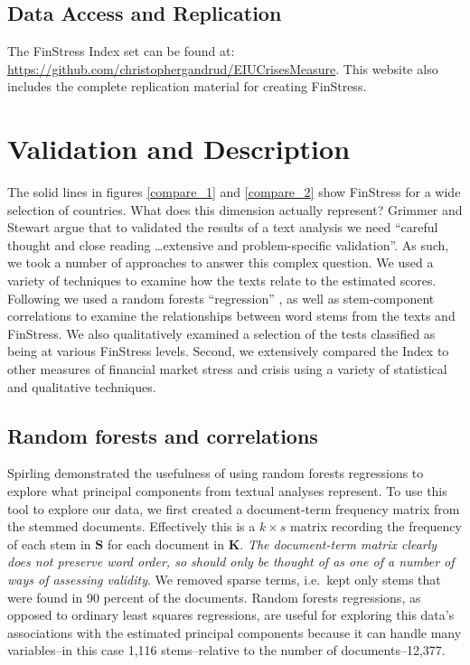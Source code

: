 \documentclass[]{article}
\begin{document}
\subsection{Data Access and Replication}

The FinStress Index set can be found at:
\url{https://github.com/christophergandrud/EIUCrisesMeasure}. This website also includes the complete replication material for creating FinStress.

\section{Validation and Description}\label{results}

The solid lines in figures \ref{compare_1} and \ref{compare_2} show FinStress for a wide selection of countries. What does this dimension actually represent? Grimmer and Stewart \citeyearpar[267]{Grimmer2013} argue that to validated the results of a text analysis we need ``careful thought and close reading \ldots extensive and problem-specific validation''. As such, we took a number of approaches to answer this complex question. We used a variety of  techniques to examine how the texts relate to the estimated scores. Following \cite{Spirling2012} we used a random forests ``regression'' \citep{Breiman2001,jones2015}, as well as stem-component correlations to examine the relationships between word stems from the texts and FinStress. We also qualitatively examined a selection of the tests classified as being at various FinStress levels. Second, we extensively compared the Index to other measures of financial market stress and crisis using a variety of statistical and qualitative techniques.

\subsection{Random forests and correlations}\label{random-forests}

Spirling \citeyearpar[88-90]{Spirling2012} demonstrated the usefulness of using random forests regressions to explore what principal components from textual analyses represent. To use this tool to explore our data, we first created a document-term frequency matrix from the stemmed documents. Effectively this is a \(k \times s\) matrix recording the frequency of each stem in \(\bm{S}\) for each document in \(\bm{K}\). \emph{The document-term matrix clearly does not preserve word order, so should only be thought of as one of a number of ways of assessing validity}. We removed sparse terms, i.e.~kept only stems that were found in 90 percent of the documents. Random forests regressions, as opposed to ordinary least squares regressions, are useful for exploring this data's associations with the estimated principal components because it can handle many variables--in this case 1,116 stems--relative to the number of documents--12,377.
\end{document}

